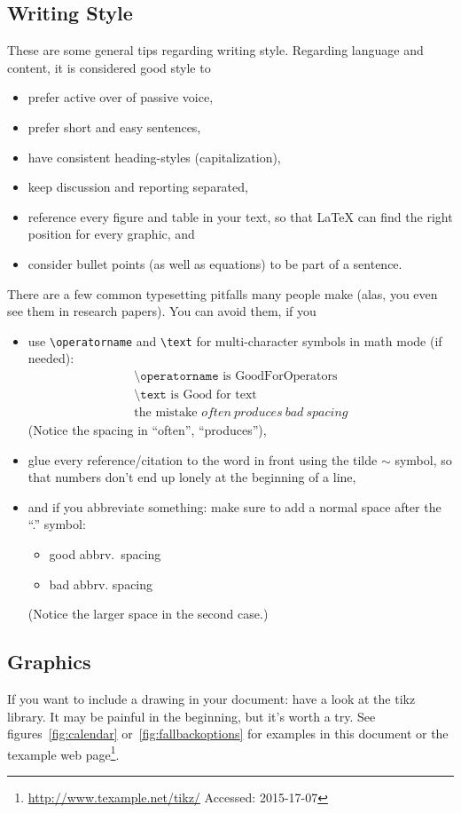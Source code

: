 \documentclass[twocolumn, a4paper, 10pt]{article}
\begin{document}
\subsection{Writing Style}
These are some general tips regarding writing style. Regarding language and content, it is considered good style to
\begin{itemize}
	\item prefer active over of passive voice, 
	\item prefer short and easy sentences, 
	\item have consistent heading-styles (capitalization),
	\item keep discussion and reporting separated,
	\item reference every figure and table in your text, so that \LaTeX{} can find the right position for every graphic, and
	\item consider bullet points (as well as equations) to be part of a sentence.
\end{itemize}
There are a few common typesetting pitfalls many people make (alas, you even see them in research papers). You can avoid them, if you 
\begin{itemize}
	\item use \texttt{\textbackslash{}operatorname} and \texttt{\textbackslash{}text} for multi-character symbols in math mode (if needed):
		\begin{align*}
			\texttt{\textbackslash{}operatorname} \text{ is } \operatorname{GoodForOperators} \\
			 \texttt{\textbackslash{}text} \text{ is } \text{Good for text} \\
			 \text{the mistake } often\ produces\ bad\ spacing
		\end{align*}
		(Notice the spacing in ``often'', ``produces''),
	\item glue every reference/citation to the word in front using the tilde $\mathtt{\sim}$ symbol, so that numbers don't end up lonely at the beginning of a line,
	\item and if you abbreviate something: make sure to add a normal space after the ``.'' symbol:
		\begin{itemize}
			\item[] good abbrv.\ spacing
			\item[] bad abbrv. spacing
		\end{itemize}
		(Notice the larger space in the second case.)
\end{itemize}
\subsection{Graphics}
If you want to include a drawing in your document: have a look at the tikz library. It may be painful in the beginning, but  it's worth a try. See figures~\ref{fig:calendar} or~\ref{fig:fallbackoptions} for examples in this document or the texample web page\footnote{\url{http://www.texample.net/tikz/} Accessed: 2015-17-07}. 
\end{document}
